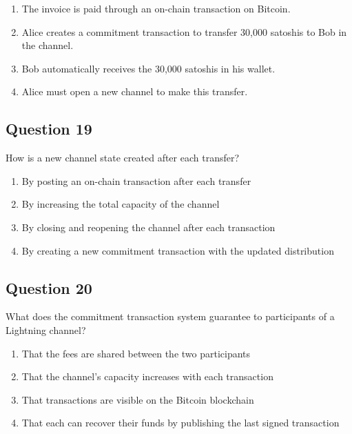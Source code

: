 \documentclass[12pt,a4paper]{article}
\begin{document}
\begin{enumerate}[label=\Alph*., leftmargin=*]
\item The invoice is paid through an on-chain transaction on Bitcoin.
\item Alice creates a commitment transaction to transfer 30,000 satoshis to Bob in the channel.
\item Bob automatically receives the 30,000 satoshis in his wallet.
\item Alice must open a new channel to make this transfer.
\end{enumerate}

\bigskip


\subsection*{Question 19}
How is a new channel state created after each transfer?

\begin{enumerate}[label=\Alph*., leftmargin=*]
\item By posting an on-chain transaction after each transfer
\item By increasing the total capacity of the channel
\item By closing and reopening the channel after each transaction
\item By creating a new commitment transaction with the updated distribution
\end{enumerate}

\bigskip


\subsection*{Question 20}
What does the commitment transaction system guarantee to participants of a Lightning channel?

\begin{enumerate}[label=\Alph*., leftmargin=*]
\item That the fees are shared between the two participants
\item That the channel's capacity increases with each transaction
\item That transactions are visible on the Bitcoin blockchain
\item That each can recover their funds by publishing the last signed transaction
\end{enumerate}

\bigskip
\end{document}
